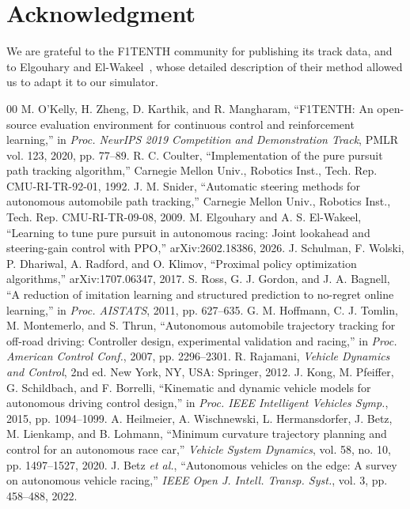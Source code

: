 \documentclass[conference]{IEEEtran}
\begin{document}
\section*{Acknowledgment}
We are grateful to the F1TENTH community for publishing its track data, and to Elgouhary and El-Wakeel~\cite{elgouhary2026}, whose detailed description of their method allowed us to adapt it to our simulator.

\begin{thebibliography}{00}
 M. O'Kelly, H. Zheng, D. Karthik, and R. Mangharam, ``F1TENTH: An open-source evaluation environment for continuous control and reinforcement learning,'' in \textit{Proc. NeurIPS 2019 Competition and Demonstration Track}, PMLR vol. 123, 2020, pp. 77--89.
 R. C. Coulter, ``Implementation of the pure pursuit path tracking algorithm,'' Carnegie Mellon Univ., Robotics Inst., Tech. Rep. CMU-RI-TR-92-01, 1992.
 J. M. Snider, ``Automatic steering methods for autonomous automobile path tracking,'' Carnegie Mellon Univ., Robotics Inst., Tech. Rep. CMU-RI-TR-09-08, 2009.
 M. Elgouhary and A. S. El-Wakeel, ``Learning to tune pure pursuit in autonomous racing: Joint lookahead and steering-gain control with PPO,'' arXiv:2602.18386, 2026.
 J. Schulman, F. Wolski, P. Dhariwal, A. Radford, and O. Klimov, ``Proximal policy optimization algorithms,'' arXiv:1707.06347, 2017.
 S. Ross, G. J. Gordon, and J. A. Bagnell, ``A reduction of imitation learning and structured prediction to no-regret online learning,'' in \textit{Proc. AISTATS}, 2011, pp. 627--635.
 G. M. Hoffmann, C. J. Tomlin, M. Montemerlo, and S. Thrun, ``Autonomous automobile trajectory tracking for off-road driving: Controller design, experimental validation and racing,'' in \textit{Proc. American Control Conf.}, 2007, pp. 2296--2301.
 R. Rajamani, \textit{Vehicle Dynamics and Control}, 2nd ed. New York, NY, USA: Springer, 2012.
 J. Kong, M. Pfeiffer, G. Schildbach, and F. Borrelli, ``Kinematic and dynamic vehicle models for autonomous driving control design,'' in \textit{Proc. IEEE Intelligent Vehicles Symp.}, 2015, pp. 1094--1099.
 A. Heilmeier, A. Wischnewski, L. Hermansdorfer, J. Betz, M. Lienkamp, and B. Lohmann, ``Minimum curvature trajectory planning and control for an autonomous race car,'' \textit{Vehicle System Dynamics}, vol. 58, no. 10, pp. 1497--1527, 2020.
 J. Betz \textit{et al.}, ``Autonomous vehicles on the edge: A survey on autonomous vehicle racing,'' \textit{IEEE Open J. Intell. Transp. Syst.}, vol. 3, pp. 458--488, 2022.

\end{thebibliography}
\end{document}
